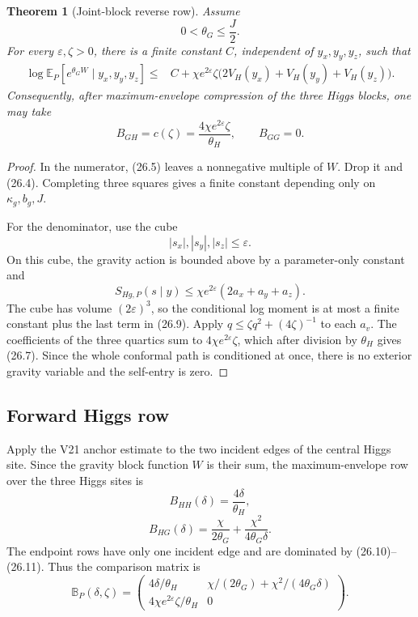 \documentclass[11pt]{article}
\newtheorem{theorem}{Theorem}[section]
\theoremstyle{remark}
\begin{document}
\begin{theorem}[Joint-block reverse row]
\label{thm:v17v26-reverse}
Assume
\[
 0<\theta_G\leq\frac J2.                           \tag{26.5}
\]
For every \(\varepsilon,\zeta>0\), there is a finite constant \(C\),
independent of \(y_x,y_y,y_z\), such that
\[
\begin{aligned}
 \log\mathbb E_P\left[e^{\theta_GW}\mid y_x,y_y,y_z\right]
 \leq{}&C+\chi e^{2\varepsilon}\zeta
 \bigl(2V_H(y_x)+V_H(y_y)+V_H(y_z)\bigr).         \tag{26.6}
\end{aligned}
\]
Consequently, after maximum-envelope compression of the three Higgs
blocks, one may take
\[
 B_{GH}=c(\zeta)
 =\frac{4\chi e^{2\varepsilon}\zeta}{\theta_H},
 \qquad B_{GG}=0.                                  \tag{26.7}
\]
\end{theorem}

\begin{proof}
In the numerator, (26.5) leaves a nonnegative multiple of \(W\).
Drop it and (26.4).  Completing three squares gives a finite constant
depending only on \(\kappa_g,b_g,J\).

For the denominator, use the cube
\[
 |s_x|,|s_y|,|s_z|\leq\varepsilon.                 \tag{26.8}
\]
On this cube, the gravity action is bounded above by a parameter-only
constant and
\[
 S_{H\!g,P}(s\mid y)
 \leq\chi e^{2\varepsilon}(2a_x+a_y+a_z).          \tag{26.9}
\]
The cube has volume \((2\varepsilon)^3\), so the conditional log moment
is at most a finite constant plus the last term in (26.9).  Apply
\(q\leq\zeta q^2+(4\zeta)^{-1}\) to each \(a_v\).  The coefficients of
the three quartics sum to \(4\chi e^{2\varepsilon}\zeta\), which after
division by \(\theta_H\) gives (26.7).  Since the whole conformal path
is conditioned at once, there is no exterior gravity variable and the
self-entry is zero.
\end{proof}

\subsection{Forward Higgs row}

Apply the V21 anchor estimate to the two incident edges of the central
Higgs site.  Since the gravity block function \(W\) is their sum, the
maximum-envelope row over the three Higgs sites is
\[
 B_{HH}(\delta)=\frac{4\delta}{\theta_H},           \tag{26.10}
\]
\[
 B_{HG}(\delta)
 =\frac{\chi}{2\theta_G}
 +\frac{\chi^2}{4\theta_G\delta}.                 \tag{26.11}
\]
The endpoint rows have only one incident edge and are dominated by
(26.10)--(26.11).  Thus the comparison matrix is
\[
 \mathbb B_P(\delta,\zeta)
 =\begin{pmatrix}
 4\delta/\theta_H&
 \chi/(2\theta_G)+\chi^2/(4\theta_G\delta)\\
 4\chi e^{2\varepsilon}\zeta/\theta_H&0
 \end{pmatrix}.                                   \tag{26.12}
\]
\end{document}
